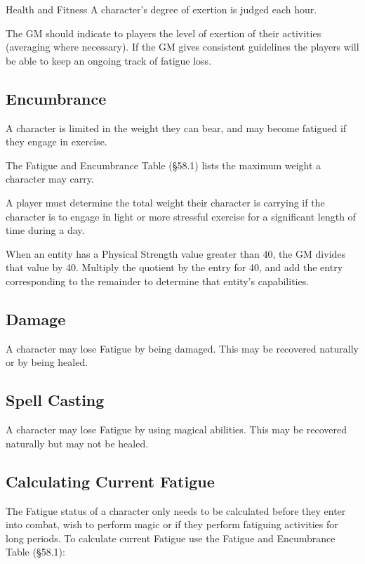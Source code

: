 \begin{Chapter}{Health and Fitness}
A character’s degree of exertion is judged each hour.

The GM should indicate to players the level of exertion of their
activities (averaging where necessary).  If the GM gives consistent
guidelines the players will be able to keep an ongoing track of
fatigue loss.

\subsection{Encumbrance}

A character is limited in the weight they can bear, and may become
fatigued if they engage in exercise.

The Fatigue and Encumbrance Table (§58.1) lists the maximum weight a
character may carry.

A player must determine the total weight their character is carrying
if the character is to engage in light or more stressful exercise for
a significant length of time during a day.

When an entity has a Physical Strength value greater than 40, the GM
divides that value by 40.  Multiply the quotient by the entry for 40,
and add the entry corresponding to the remainder to determine that
entity’s capabilities.

\subsection{Damage}

A character may lose Fatigue by being damaged.  This may be recovered
naturally or by being healed.

\subsection{Spell Casting}

A character may lose Fatigue by using magical abilities. This may be
recovered naturally but may not be healed.

\subsection{Calculating Current Fatigue}

The Fatigue status of a character only needs to be calculated before
they enter into combat, wish to perform magic or if they perform
fatiguing activities for long periods.  To calculate current Fatigue
use the Fatigue and Encumbrance Table (§58.1):


\end{Chapter}
